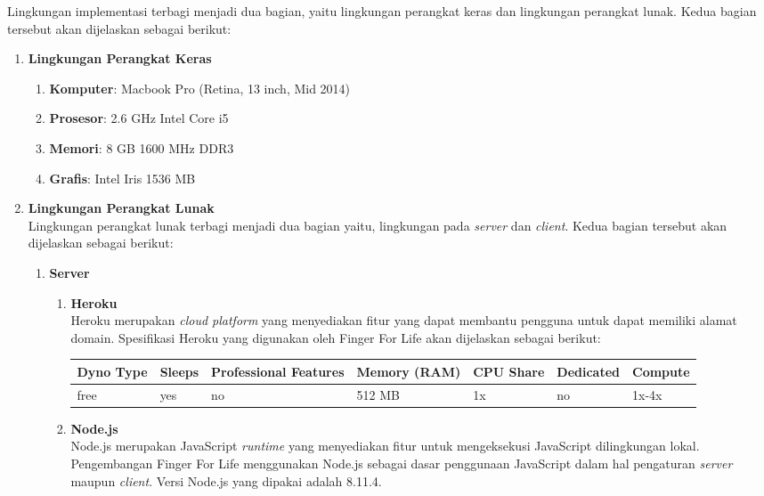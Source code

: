 Lingkungan implementasi terbagi menjadi dua bagian, yaitu lingkungan perangkat keras dan lingkungan perangkat lunak. Kedua bagian tersebut akan dijelaskan sebagai berikut:
\begin{enumerate}
	\item \textbf{Lingkungan Perangkat Keras} \\
	\begin{enumerate}
		\item \textbf{Komputer}: Macbook Pro (Retina, 13 inch, Mid 2014)
		\item \textbf{Prosesor}: 2.6 GHz Intel Core i5
		\item \textbf{Memori}: 8 GB 1600 MHz DDR3
		\item \textbf{Grafis}: Intel Iris 1536 MB
	\end{enumerate}

	\item \textbf{Lingkungan Perangkat Lunak} \\
	Lingkungan perangkat lunak terbagi menjadi dua bagian yaitu, lingkungan pada \textit{server} dan \textit{client}. Kedua bagian tersebut akan dijelaskan sebagai berikut:
	\begin{enumerate}
		\item \textbf{Server} \\
		\begin{enumerate}
			\item \textbf{Heroku} \\
			Heroku merupakan \textit{cloud platform} yang menyediakan fitur yang dapat membantu pengguna untuk dapat memiliki alamat domain. Spesifikasi Heroku yang digunakan oleh Finger For Life akan dijelaskan sebagai berikut:
			
			\begin{tabular}{ |p{1.5cm}|p{1.5cm}|p{2cm}|p{1.5cm}|p{1.5cm}|p{1.5cm}|p{1.5cm}|}
			\hline
			Dyno Type & Sleeps & Professional Features & Memory (RAM) & CPU Share & Dedicated & Compute \\ \hline
			free & yes & no & 512 MB & 1x & no & 1x-4x \\ \hline
				
			\end{tabular}
			
			\item \textbf{Node.js} \\
			Node.js merupakan JavaScript \textit{runtime} yang menyediakan fitur untuk mengeksekusi JavaScript dilingkungan lokal. Pengembangan Finger For Life menggunakan Node.js sebagai dasar penggunaan JavaScript dalam hal pengaturan \textit{server} maupun \textit{client}. Versi Node.js yang dipakai adalah 8.11.4.
			

\end{enumerate}
\end{enumerate}
\end{enumerate}
